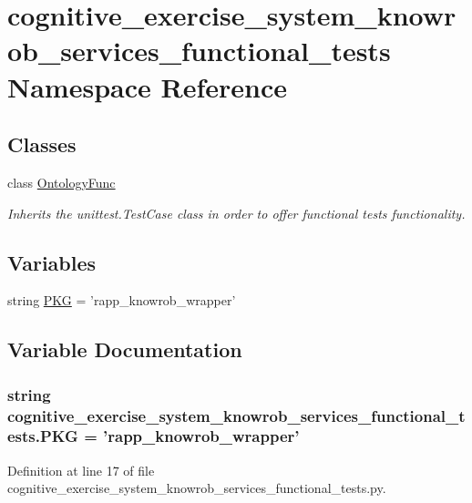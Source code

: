 \hypertarget{namespacecognitive__exercise__system__knowrob__services__functional__tests}{\section{cognitive\-\_\-exercise\-\_\-system\-\_\-knowrob\-\_\-services\-\_\-functional\-\_\-tests Namespace Reference}
\label{namespacecognitive__exercise__system__knowrob__services__functional__tests}
}
\subsection*{Classes}
\begin{DoxyCompactItemize}
\item 
class \hyperlink{classcognitive__exercise__system__knowrob__services__functional__tests_1_1OntologyFunc}{Ontology\-Func}
\begin{DoxyCompactList}\small\item\em Inherits the unittest.\-Test\-Case class in order to offer functional tests functionality. \end{DoxyCompactList}\end{DoxyCompactItemize}
\subsection*{Variables}
\begin{DoxyCompactItemize}
\item 
string \hyperlink{namespacecognitive__exercise__system__knowrob__services__functional__tests_a84a882b365c6c4220decedc0f2576405}{P\-K\-G} = 'rapp\-\_\-knowrob\-\_\-wrapper'
\end{DoxyCompactItemize}


\subsection{Variable Documentation}
\hypertarget{namespacecognitive__exercise__system__knowrob__services__functional__tests_a84a882b365c6c4220decedc0f2576405}{
\subsubsection[{P\-K\-G}]{\setlength{\rightskip}{0pt plus 5cm}string cognitive\-\_\-exercise\-\_\-system\-\_\-knowrob\-\_\-services\-\_\-functional\-\_\-tests.\-P\-K\-G = 'rapp\-\_\-knowrob\-\_\-wrapper'}}\label{namespacecognitive__exercise__system__knowrob__services__functional__tests_a84a882b365c6c4220decedc0f2576405}


Definition at line 17 of file cognitive\-\_\-exercise\-\_\-system\-\_\-knowrob\-\_\-services\-\_\-functional\-\_\-tests.\-py.


